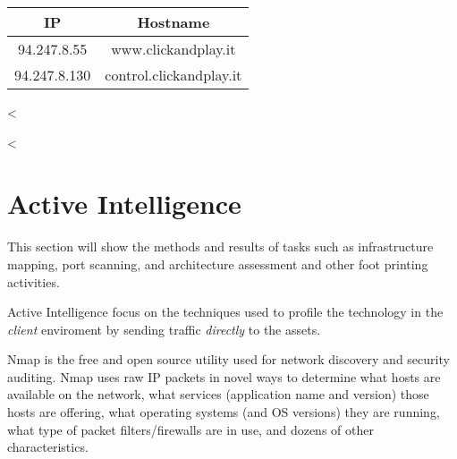       \begin{center}
        \begin{tabularx}{0.4\textwidth}{c c}
          \toprule
          \textbf{IP} & \textbf{Hostname} \\ \midrule
          94.247.8.55 &  www.clickandplay.it \\ \midrule
          94.247.8.130 & control.clickandplay.it  \\
          \bottomrule
        \end{tabularx}
      \end{center}
  <%

  <%

  \section {Active Intelligence}\label{sec:activeint}

    This section will show the methods and results of tasks such as
    infrastructure mapping, port scanning, and architecture assessment and other
    foot printing activities.

    Active Intelligence focus on the techniques used to profile the technology
    in the \textit{client} enviroment by sending traffic \textit{directly} to
    the assets.

    Nmap is the free and open source utility used for network discovery and
    security auditing. Nmap uses raw IP packets in novel ways to determine what
    hosts are available on the network, what services (application name and
    version) those hosts are offering, what operating systems (and OS versions)
    they are running, what type of packet filters/firewalls are in use, and
    dozens of other characteristics.

